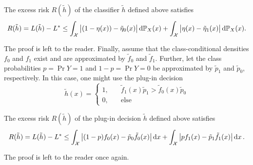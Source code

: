\begin{theorem}
The excess risk $R(\tilde h)$ of the classifier $\tilde h$ defined above satisfies
\[
    R(\tilde h) = L(\tilde h) - L^* \leq \int_{\mathcal{X}} \big\lvert (1 - \eta(x)) - \tilde\eta_0(x) \big\rvert \,\mathrm{d}\mathbb{P}_{X}(x) + \int_{\mathcal{X}} \big\lvert \eta(x) - \tilde\eta_1(x) \big\rvert \,\mathrm{d}\mathbb{P}_{X}(x).
\]
\end{theorem}

The proof is left to the reader. Finally, assume that the class-conditional densities $f_0$ and $f_1$ exist and are approximated by $\tilde f_0$ and $\tilde f_1$. Further, let the class probabilities $p = \Pr{Y=1}$ and $1-p = \Pr{Y=0}$ be approximated by $\tilde p_1$ and $\tilde p_0$, respectively. In this case, one might use the plug-in decision
\[
    \tilde h(x) = \begin{cases}
        1, \quad &\tilde f_1(x) \tilde p_1 > \tilde f_0(x) \tilde p_0 \\
        0, \quad &\text{else}
    \end{cases}
\]

\begin{proposition}
The excess risk $R(\tilde h)$ of the plug-in decision $\tilde h$ defined above satisfies
\[
    R(\tilde h) = L(\tilde h) - L^* \leq \int_{\mathcal{X}} \big\lvert (1-p) f_0(x) - \tilde p_0 \tilde f_0(x) \big\rvert \,\mathrm{d}x + \int_{\mathcal{X}} \big\lvert p f_1(x) - \tilde p_1 \tilde f_1(x) \big\rvert \,\mathrm{d}x \, .
\]
\end{proposition}

The proof is left to the reader once again.
